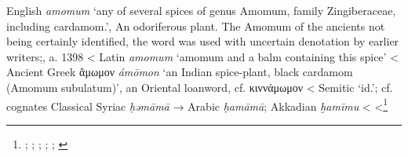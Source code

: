 \begin{etymology}\label{ety:amomum}
English \textit{amomum} `any of several spices of genus Amomum, family Zingiberaceae, including cardamom.', An odoriferous plant. The Amomum of the ancients not being certainly identified, the word was used with uncertain denotation by earlier writers;, a. 1398
< Latin \textit{amomum} `amomum and a balm containing this spice'
< Ancient Greek {ἄμωμον} \textit{ámōmon} `an Indian spice-plant, black cardamom (Amomum subulatum)', an Oriental loanword, cf. κιννάμωμον
< Semitic `id.'; cf. cognates Classical Syriac  \textit{ḥəmāmā} → Arabic  \textit{ḥamāmā}; Akkadian \textit{ḫamīmu}
<
<\footnote{\textcite[s.v. amomum]{oed}; \textcite{lewis_latin_1879}; \textcites[]{liddell_greek-english_1940}[97]{beekes_etymological_2010}; \textcite[169]{low_aramaeische_1881}; \textcite[100]{lev_practical_2008}; \textcite[vol. 6, p. 66]{roth_assyrian_2004}}
\end{etymology}